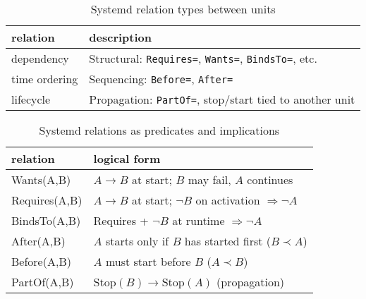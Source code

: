 \documentclass[openany, 12pt]{book}
\begin{document}
\begin{table}
  \begin{center}
    \begin{tabular}{ll}
      \toprule
      relation      & description                                                              \\
      \midrule
      dependency    & Structural: \texttt{Requires=}, \texttt{Wants=}, \texttt{BindsTo=}, etc. \\
      time ordering & Sequencing: \texttt{Before=}, \texttt{After=}                            \\
      lifecycle     & Propagation: \texttt{PartOf=}, stop/start tied to another unit           \\
      \bottomrule
    \end{tabular}
  \end{center}
  \caption{Systemd relation types between units}
\end{table}

\begin{table}[h]
  \begin{center}
    \begin{tabular}{ll}
      \toprule
      relation      & logical form                                                            \\
      \midrule
      Wants(A,B)    & $A \rightarrow B$ at start; $B$ may fail, $A$ continues                 \\
      Requires(A,B) & $A \rightarrow B$ at start; $\neg B$ on activation $\Rightarrow \neg A$ \\
      BindsTo(A,B)  & Requires + $\neg B$ at runtime $\Rightarrow \neg A$                     \\
      After(A,B)    & $A$ starts only if $B$ has started first ($B \prec A$)                  \\
      Before(A,B)   & $A$ must start before $B$ ($A \prec B$)                                 \\
      PartOf(A,B)   & $\text{Stop}(B) \rightarrow \text{Stop}(A)$ (propagation)               \\
      \bottomrule
    \end{tabular}
  \end{center}
  \caption{Systemd relations as predicates and implications}
\end{table}
\end{document}
